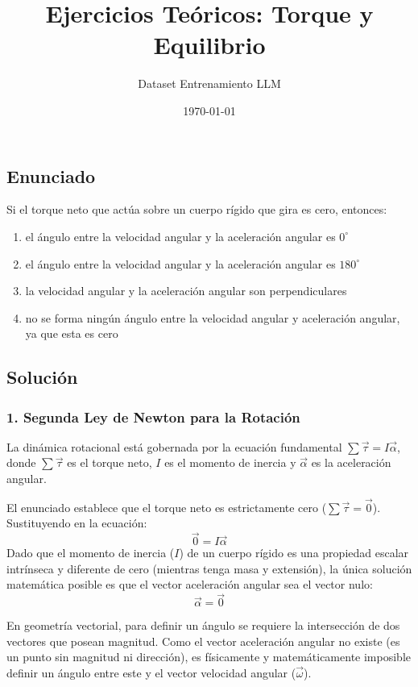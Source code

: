 \documentclass[12pt, a4paper]{article}
\title{Ejercicios Teóricos: Torque y Equilibrio}
\author{Dataset Entrenamiento LLM}
\date{\today}
\begin{document}
\maketitle

\subsection*{Enunciado}
Si el torque neto que actúa sobre un cuerpo rígido que gira es cero, entonces:
\begin{enumerate}[label=\alph*)]
    \item el ángulo entre la velocidad angular y la aceleración angular es $0^\circ$
    \item el ángulo entre la velocidad angular y la aceleración angular es $180^\circ$
    \item la velocidad angular y la aceleración angular son perpendiculares
    \item no se forma ningún ángulo entre la velocidad angular y aceleración angular, ya que esta es cero
\end{enumerate}

\subsection*{Solución}

\subsubsection*{1. Segunda Ley de Newton para la Rotación}
La dinámica rotacional está gobernada por la ecuación fundamental $\sum \vec{\tau} = I \vec{\alpha}$, donde $\sum \vec{\tau}$ es el torque neto, $I$ es el momento de inercia y $\vec{\alpha}$ es la aceleración angular.

El enunciado establece que el torque neto es estrictamente cero ($\sum \vec{\tau} = \vec{0}$). Sustituyendo en la ecuación:
$$ \vec{0} = I \vec{\alpha} $$
Dado que el momento de inercia ($I$) de un cuerpo rígido es una propiedad escalar intrínseca y diferente de cero (mientras tenga masa y extensión), la única solución matemática posible es que el vector aceleración angular sea el vector nulo:
$$ \vec{\alpha} = \vec{0} $$

En geometría vectorial, para definir un ángulo se requiere la intersección de dos vectores que posean magnitud. Como el vector aceleración angular no existe (es un punto sin magnitud ni dirección), es físicamente y matemáticamente imposible definir un ángulo entre este y el vector velocidad angular ($\vec{\omega}$).
\end{document}
